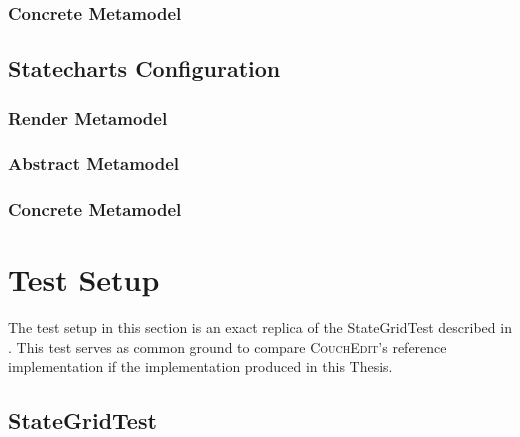 \subsection*{Concrete Metamodel}
\raggedbottom



\section{Statecharts Configuration}
\label{app:state}
\subsection*{Render Metamodel}


\subsection*{Abstract Metamodel}


\subsection*{Concrete Metamodel}



\chapter{Test Setup}
\label{app:testsetup}
The test setup in this section is an exact replica of the StateGridTest described in \cite{nachreiner_couchedit_2020}. This test serves as common ground to compare \textsc{CouchEdit}'s reference implementation if the implementation produced in this Thesis.

\section{StateGridTest}
